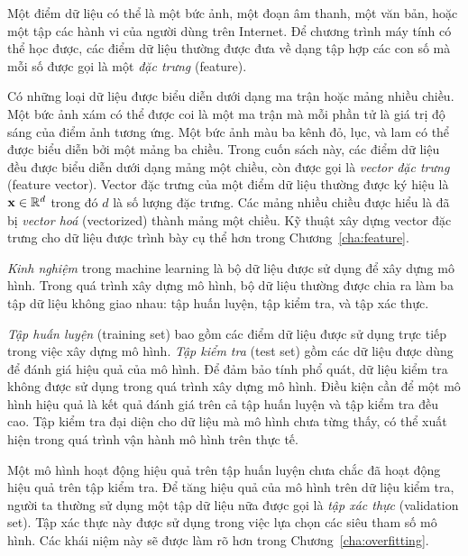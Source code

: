 Một điểm dữ liệu có thể là một bức ảnh, một đoạn âm thanh, một văn bản, hoặc một
tập các hành vi của người dùng trên Internet. Để chương trình máy tính có thể
học được, các điểm dữ liệu thường được đưa về dạng tập hợp các con số mà mỗi số
được gọi là một \textit{đặc trưng} (feature).


Có những loại dữ liệu được biểu diễn dưới dạng ma trận hoặc mảng nhiều chiều.
Một bức ảnh xám có thể được coi là một ma trận mà mỗi phần tử là giá trị độ sáng
của điểm ảnh tương ứng. Một bức ảnh màu ba kênh đỏ, lục, và lam có thể được biểu
diễn bởi một mảng ba chiều. Trong cuốn sách này, các điểm dữ liệu đều được biểu
diễn dưới dạng mảng một chiều, còn được gọi là \textit{vector đặc trưng} (feature vector). Vector đặc trưng của một điểm dữ liệu thường được ký hiệu là $\mathbf{x} \in \mathbb{R}^d$ trong đó $d$ là số lượng đặc trưng. Các mảng nhiều chiều được hiểu là đã bị \textit{vector hoá} (vectorized) thành mảng một chiều. Kỹ thuật xây dựng vector đặc trưng cho dữ liệu được trình bày cụ thể hơn trong Chương~\ref{cha:feature}.

\textit{Kinh nghiệm} trong machine learning là bộ dữ liệu được sử dụng để xây
dựng mô hình. Trong quá trình xây dựng mô hình, bộ dữ liệu thường được chia ra
làm ba tập dữ liệu không giao nhau: tập huấn luyện, tập kiểm tra, và tập xác thực.




\textit{Tập huấn luyện} (training set) bao gồm các điểm dữ liệu được sử dụng trực tiếp trong việc xây dựng mô hình. \textit{Tập kiểm tra} (test set) gồm các dữ liệu được dùng để đánh giá hiệu quả của mô hình. Để đảm bảo tính phổ quát, dữ liệu kiểm tra không được sử dụng trong quá trình xây dựng mô hình. Điều kiện cần để một mô hình hiệu quả là kết quả đánh giá trên cả tập huấn luyện và tập kiểm tra đều cao. Tập kiểm tra đại diện cho dữ liệu mà mô hình chưa từng thấy, có thể xuất hiện trong quá trình vận hành mô hình trên thực tế.

Một mô hình hoạt động hiệu quả trên tập huấn luyện chưa chắc đã hoạt động hiệu quả trên tập kiểm tra. Để tăng hiệu quả của mô hình trên dữ liệu kiểm tra, người ta thường sử dụng một tập dữ liệu nữa được gọi là \textit{tập xác thực} (validation set). Tập xác thực này được sử dụng trong việc lựa chọn các siêu tham số mô hình. Các khái niệm này sẽ được làm rõ hơn trong Chương~\ref{cha:overfitting}.


